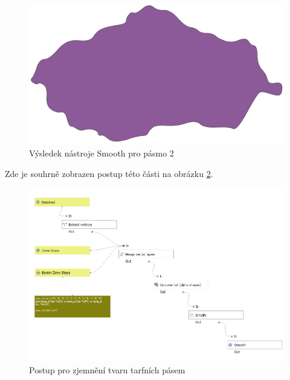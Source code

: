 \begin{figure}[H] \centering
    \includegraphics[width=400pt]{./pictures/smooth.png}
    \caption[Výsledek nástroje Smooth pro pásmo 2]{Výsledek nástroje Smooth pro pásmo 2}
	\label{fig:smooth}                                
\end{figure}

Zde je souhrně zobrazen postup této části na obrázku \ref{fig:postup-smooth}.

\begin{figure}[H] \centering
    \includegraphics[width=400pt]{./pictures/postup-smooth.png}
    \caption[Postup pro zjemnění tvaru tarfních pásem]{Postup pro zjemnění tvaru tarfních pásem}
	\label{fig:postup-smooth}              
\end{figure}